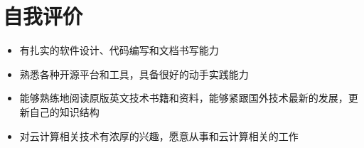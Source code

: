 \documentclass{resume}
\begin{document}



\section{自我评价}
\begin{itemize}
  \item 有扎实的软件设计、代码编写和文档书写能力
  \item 熟悉各种开源平台和工具，具备很好的动手实践能力
  \item 能够熟练地阅读原版英文技术书籍和资料，能够紧跟国外技术最新的发展，更新自己的知识结构
  \item 对云计算相关技术有浓厚的兴趣，愿意从事和云计算相关的工作
\end{itemize}
\end{document}
